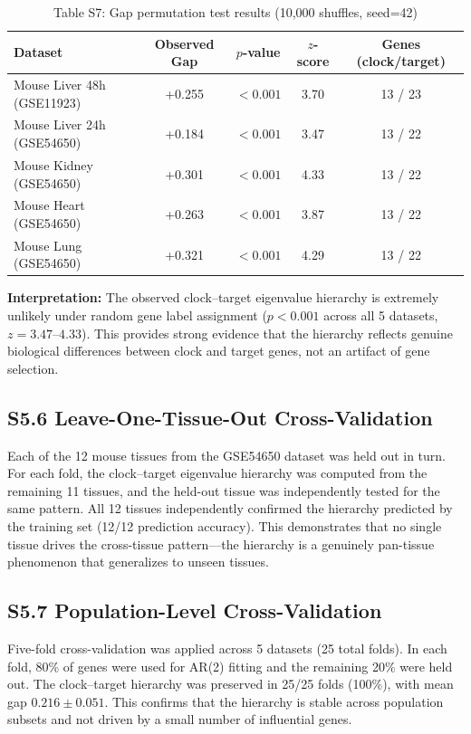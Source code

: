 \documentclass[11pt,a4paper]{article}
\begin{document}
\begin{table}[H]
\centering
\caption{Table S7: Gap permutation test results (10,000 shuffles, seed=42)}
\label{tab:permgap_supp}
\begin{tabular}{lcccc}
\toprule
Dataset & Observed Gap & $p$-value & $z$-score & Genes (clock/target) \\
\midrule
Mouse Liver 48h (GSE11923) & +0.255 & $<0.001$ & 3.70 & 13 / 23 \\
Mouse Liver 24h (GSE54650) & +0.184 & $<0.001$ & 3.47 & 13 / 22 \\
Mouse Kidney (GSE54650) & +0.301 & $<0.001$ & 4.33 & 13 / 22 \\
Mouse Heart (GSE54650) & +0.263 & $<0.001$ & 3.87 & 13 / 22 \\
Mouse Lung (GSE54650) & +0.321 & $<0.001$ & 4.29 & 13 / 22 \\
\bottomrule
\end{tabular}
\end{table}

\textbf{Interpretation:} The observed clock--target eigenvalue hierarchy is extremely unlikely under random gene label assignment ($p < 0.001$ across all 5 datasets, $z = 3.47$--$4.33$). This provides strong evidence that the hierarchy reflects genuine biological differences between clock and target genes, not an artifact of gene selection.

\subsection{S5.6 Leave-One-Tissue-Out Cross-Validation}

Each of the 12 mouse tissues from the GSE54650 dataset was held out in turn. For each fold, the clock--target eigenvalue hierarchy was computed from the remaining 11 tissues, and the held-out tissue was independently tested for the same pattern. All 12 tissues independently confirmed the hierarchy predicted by the training set (12/12 prediction accuracy). This demonstrates that no single tissue drives the cross-tissue pattern---the hierarchy is a genuinely pan-tissue phenomenon that generalizes to unseen tissues.

\subsection{S5.7 Population-Level Cross-Validation}

Five-fold cross-validation was applied across 5 datasets (25 total folds). In each fold, 80\% of genes were used for AR(2) fitting and the remaining 20\% were held out. The clock--target hierarchy was preserved in 25/25 folds (100\%), with mean gap $0.216 \pm 0.051$. This confirms that the hierarchy is stable across population subsets and not driven by a small number of influential genes.
\end{document}

